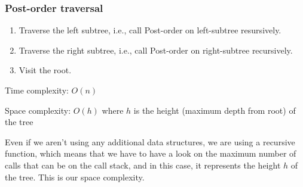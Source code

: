 \documentclass[a4paper,11pt]{book}
\begin{document}
\subsubsection{Post-order traversal}
        \begin{enumerate}
            \item Traverse the left subtree, i.e., call Post-order on left-subtree resursively.
            \item Traverse the right subtree, i.e., call Post-order on right-subtree recursively.
            \item Visit the root.
        \end{enumerate}
        \begin{center}
        \vspace{6mm}

        \end{center}

\noindent Time complexity: $O(n)$

\noindent Space complexity: $O(h)$ where $h$ is the height (maximum depth from root) of the tree

Even if we aren't using any additional data structures, we are using a recursive function, which means that we have to have a look on the maximum number of calls that can be on the call stack, and in this case, it represents the height $h$ of the tree. This is our space complexity.
\end{document}
